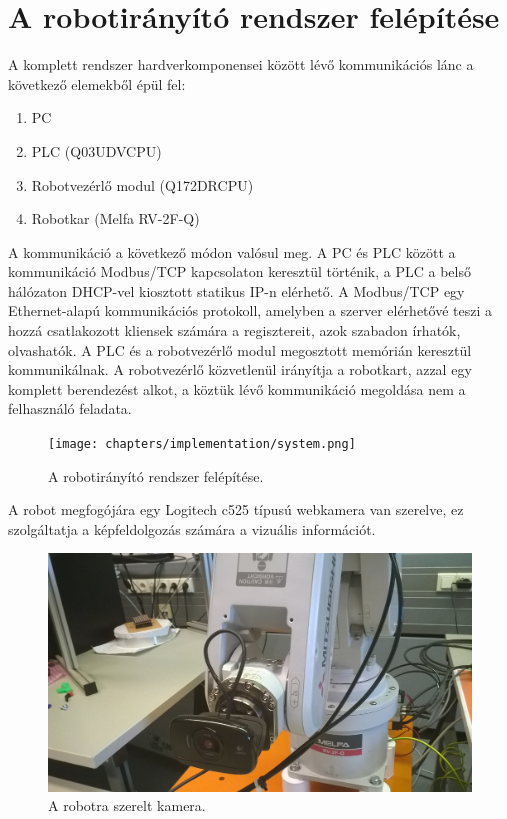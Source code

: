 
\section{A robotirányító rendszer felépítése}
	A komplett rendszer hardverkomponensei között lévő kommunikációs lánc a következő elemekből épül fel:
	
\begin{enumerate}
\item PC
\item PLC (Q03UDVCPU)
\item Robotvezérlő modul (Q172DRCPU)
\item Robotkar (Melfa RV-2F-Q)
\end{enumerate}	

	A kommunikáció a következő módon valósul meg. A PC és PLC között a kommunikáció Modbus/TCP kapcsolaton keresztül történik, a PLC a belső hálózaton DHCP-vel kiosztott statikus IP-n elérhető. A Modbus/TCP egy Ethernet-alapú kommunikációs protokoll, amelyben a szerver elérhetővé teszi a hozzá csatlakozott kliensek számára a regisztereit, azok szabadon írhatók, olvashatók. A PLC és a robotvezérlő modul megosztott memórián keresztül kommunikálnak. A robotvezérlő közvetlenül irányítja a robotkart, azzal egy komplett berendezést alkot, a köztük lévő kommunikáció megoldása nem a felhasználó feladata.
	
\begin{figure}[H]
\centering
\texttt{[image: chapters/implementation/system.png]}
\caption{A robotirányító rendszer felépítése.}
\end{figure}
	
	A robot megfogójára egy Logitech c525 típusú webkamera van szerelve, ez szolgáltatja a képfeldolgozás számára a vizuális információt.
	
	
\begin{figure}[H]
\centering
\includegraphics[width=\linewidth]{chapters/implementation/robocam.jpg}
\caption{A robotra szerelt kamera.}
\end{figure}
	
